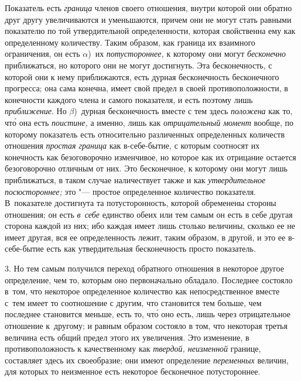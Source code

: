 Показатель есть {\em граница} членов своего отношения, внутри которой они
обратно друг другу увеличиваются и уменьшаются, причем они не могут стать
равными показателю по той утвердительной определенности, которая свойственна
ему как определенному количеству. Таким образом, как граница их взаимного
ограничения, он есть $\alpha$)~их {\em потустороннее,} к которому они могут
{\em бесконечно} приближаться, но которого они не могут достигнуть. Эта
бесконечность, с которой они к нему приближаются, есть дурная бесконечность
бесконечного прогресса; она сама конечна, имеет свой предел в своей
противоположности, в конечности каждого члена и самого показателя, и есть
поэтому лишь {\em приближение}. Но $\beta$)~дурная бесконечность вместе
с тем здесь {\em положена} как то, чт\'{о} она есть {\em поистине,} а именно,
лишь как {\em отрицательный момент} вообще, по которому показатель есть
относительно различенных определенных количеств отношения {\em простая граница}
как в-себе-бытие, с которым соотносят их конечность как безоговорочно
изменчивое, но которое как их отрицание остается безоговорочно отличным от них.
Это бесконечное, к которому они могут лишь приближаться, в таком случае
наличествует также и как {\em утвердительное посюстороннее;} это "--- простое
определенное количество показателя. В~показателе достигнута та потусторонность,
которой обременены стороны отношения; он есть {\em в~себе} единство обеих или
тем самым он есть в себе другая сторона каждой из них; ибо каждая имеет лишь
столько величины, сколько ее не имеет другая, вся ее определенность лежит,
таким образом, в другой, и это ее в-себе-бытие есть как утвердительная
бесконечность просто показатель.

3. Но тем самым получился переход обратного отношения в некоторое другое
определение, чем то, которым оно первоначально обладало. Последнее состояло
в~том, что некоторое определенное количество как непосредственное вместе с~тем
имеет то соотношение с другим, что становится тем больше, чем последнее
становится меньше, есть то, чт\'{о} оно есть, лишь через отрицательное
отношение к~другому; и равным образом состояло в том, что некоторая третья
величина есть общий предел этого их увеличения. Это изменение, в
противоположность к качественному как {\em твердой, неизменной} границе,
составляет здесь их своеобразие; они имеют определение {\em переменных}
величин, для которых то неизменное есть некоторое бесконечное потустороннее.

